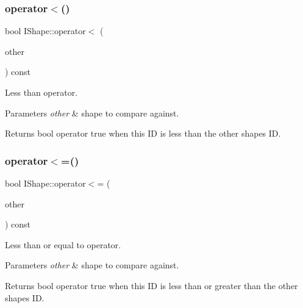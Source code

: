 \subsubsection{\texorpdfstring{operator$<$()}{operator<()}}
{\footnotesize\ttfamily bool I\+Shape\+::operator$<$ (\begin{DoxyParamCaption}\item[{const \mbox{\hyperlink{class_i_shape}{I\+Shape}} \&}]{other }\end{DoxyParamCaption}) const}



Less than operator. 


\begin{DoxyParams}{Parameters}
{\em other} & shape to compare against. \\
\hline
\end{DoxyParams}
\begin{DoxyReturn}{Returns}
bool operator true when this ID is less than the other shape\textquotesingle{}s ID. 
\end{DoxyReturn}
\mbox{\label{class_i_shape_a7cb22874dc0be6b43b79a94c88c3578a}} 
\subsubsection{\texorpdfstring{operator$<$=()}{operator<=()}}
{\footnotesize\ttfamily bool I\+Shape\+::operator$<$= (\begin{DoxyParamCaption}\item[{const \mbox{\hyperlink{class_i_shape}{I\+Shape}} \&}]{other }\end{DoxyParamCaption}) const}



Less than or equal to operator. 


\begin{DoxyParams}{Parameters}
{\em other} & shape to compare against. \\
\hline
\end{DoxyParams}
\begin{DoxyReturn}{Returns}
bool operator true when this ID is less than or greater than the other shape\textquotesingle{}s ID. 
\end{DoxyReturn}
\mbox{\label{class_i_shape_ab21aa52b87b2544a934ebdf51aba87ff}} 
